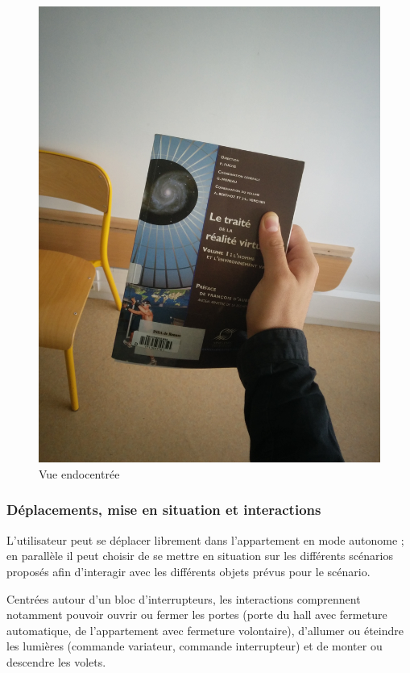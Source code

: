 \begin{figure}[h]
\begin{minipage}[b]{0.3\textwidth}
		\includegraphics[width=\linewidth]{1-PreEtude/img/vue_fps}
		\caption{Vue endocentrée}
		\label{endo}
	\end{minipage}
\end{figure}
\subsubsection{Déplacements, mise en situation et interactions}

L'utilisateur peut se déplacer librement dans l'appartement en mode autonome ; en parallèle il peut choisir de se mettre en situation sur les différents scénarios proposés afin d'interagir avec les différents objets prévus pour le scénario.

Centrées autour d'un bloc d'interrupteurs, les interactions comprennent notamment pouvoir ouvrir ou fermer les portes (porte du hall avec fermeture automatique, de l'appartement avec fermeture volontaire), d'allumer ou éteindre les lumières (commande variateur, commande interrupteur) et de monter ou descendre les volets.

